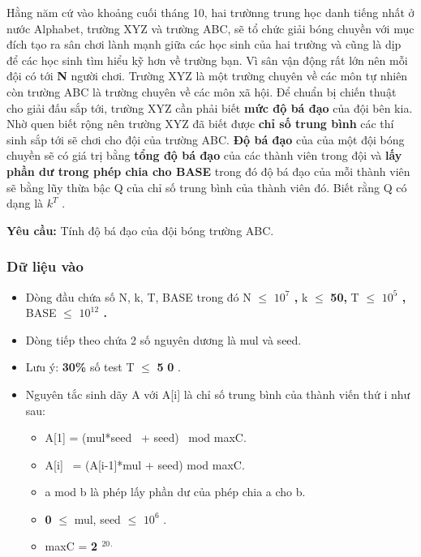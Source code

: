 





    Hằng năm cứ vào khoảng cuối tháng 10, hai trườnng trung học danh tiếng nhất ở nước Alphabet, trường XYZ và trường ABC, sẽ tổ chức giải bóng chuyền với mục đích tạo ra sân chơi lành mạnh giữa các học sinh của hai trường và cũng là dịp để các học sinh tìm hiểu kỹ hơn về trường bạn. Vì sân vận động rất lớn nên mỗi đội có tới    \textbf{     N    }    người chơi. Trường XYZ là một trường chuyên về các môn tự nhiên còn trường ABC là trường chuyên về các môn xã hội. Để chuẩn bị chiến thuật cho giải đấu sắp tới, trường XYZ cần phải biết    \textbf{     mức độ bá đạo    }    của đội bên kia. Nhờ quen biết rộng nên trường XYZ đã biết được    \textbf{     chỉ số trung bình    }    các thí sinh sắp tới sẽ chơi cho đội của trường ABC.    \textbf{     Độ bá đạo    }    của của một đội bóng chuyền sẽ có giá trị bằng    \textbf{     tổng độ bá đạo    }    của các thành viên trong đội và    \textbf{     lấy phần dư trong phép chia cho BASE    }    trong đó độ bá đạo của mỗi thành viên sẽ bằng lũy thừa bậc Q của chỉ số trung bình của thành viên đó. Biết rằng Q có dạng là    \textbf{     $k^{T}$}    .   



\textbf{     Yêu cầu:    }    Tính độ bá đạo của đội bóng trường ABC.   



\subsubsection{    Dữ liệu vào   }


\begin{itemize}
	\item      Dòng đầu chứa số N, k, T, BASE trong đó N  $\le$      \textbf{      $10^{7}$      ,     }     k  $\le$      \textbf{      50,     }     T  $\le$      \textbf{      $10^{5}$      ,     }     BASE  $\le$      \textbf{      $10^{12}$      .     }
	\item      Dòng tiếp theo chứa 2 số nguyên dương là mul và seed.    
	\item      Lưu ý:     \textbf{      30\%     }     số test T  $\le$      \textbf{      5     }\textbf{      0     }     .    
	\item      Nguyên tắc sinh dãy A với A[i] là chỉ số trung bình của thành viến thứ i như sau:    
\begin{itemize}
	\item        A[1] = (mul*seed  + seed)  mod maxC.      
	\item        A[i]  = (A[i-1]*mul + seed) mod maxC.      
	\item        a mod b là phép lấy phần dư của phép chia a cho b.      
	\item \textbf{        0       }        $\le$  mul, seed  $\le$        \textbf{        $10^{6}$}       .      
	\item        maxC =       \textbf{\textbf{         2        }$^         20        $$^         .        $}
\end{itemize}
\end{itemize}



